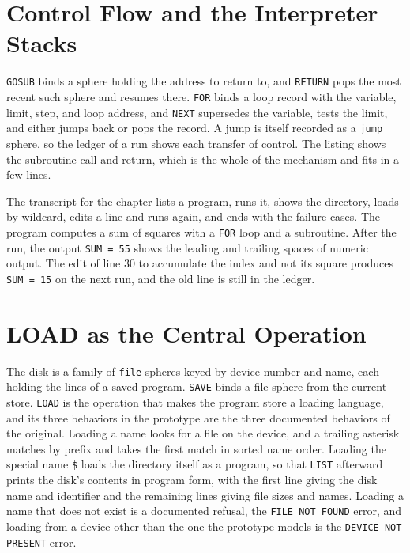 \documentclass[11pt,oneside]{report}
\theoremstyle{plain}
\theoremstyle{definition}
\theoremstyle{remark}
\newcommand{\code}[2][Python]{}
\newcommand{\transcript}[1]{}
\begin{document}
\section{Control Flow and the Interpreter Stacks}

\texttt{GOSUB} binds a sphere holding the address to return to, and \texttt{RETURN} pops the most recent such sphere and resumes there. \texttt{FOR} binds a loop record with the variable, limit, step, and loop address, and \texttt{NEXT} supersedes the variable, tests the limit, and either jumps back or pops the record. A jump is itself recorded as a \texttt{jump} sphere, so the ledger of a run shows each transfer of control. The listing shows the subroutine call and return, which is the whole of the mechanism and fits in a few lines.

\code{ex_basic_gosub}

The transcript for the chapter lists a program, runs it, shows the directory, loads by wildcard, edits a line and runs again, and ends with the failure cases. The program computes a sum of squares with a \texttt{FOR} loop and a subroutine. After the run, the output \texttt{SUM = 55} shows the leading and trailing spaces of numeric output. The edit of line 30 to accumulate the index and not its square produces \texttt{SUM = 15} on the next run, and the old line is still in the ledger.

\transcript{basic}

\section{LOAD as the Central Operation}

The disk is a family of \texttt{file} spheres keyed by device number and name, each holding the lines of a saved program. \texttt{SAVE} binds a file sphere from the current store. \texttt{LOAD} is the operation that makes the program store a loading language, and its three behaviors in the prototype are the three documented behaviors of the original. Loading a name looks for a file on the device, and a trailing asterisk matches by prefix and takes the first match in sorted name order. Loading the special name \texttt{\$} loads the directory itself as a program, so that \texttt{LIST} afterward prints the disk's contents in program form, with the first line giving the disk name and identifier and the remaining lines giving file sizes and names. Loading a name that does not exist is a documented refusal, the \texttt{FILE NOT FOUND} error, and loading from a device other than the one the prototype models is the \texttt{DEVICE NOT PRESENT} error.
\end{document}
